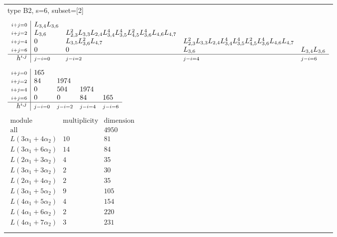 \documentclass[crop,border=2mm]{standalone}
\begin{document}
\begin{tabular}{l}
{\huge type B2, s=6, subset=[2]}\\ \\


$\displaystyle
\begin{array}{r|l l l l}
	{\scriptstyle i+j=0}&L_{3,4}L_{3,6}&&&\\
	{\scriptstyle i+j=2}&L_{3,6}&L_{2,3}^{2}L_{3,3}L_{2,4}L_{3,4}^{4}L_{3,5}^{4}L_{4,5}^{2}L_{3,6}^{4}L_{4,6}L_{4,7}&&\\
	{\scriptstyle i+j=4}&0&L_{3,5}L_{3,6}^{2}L_{4,7}&L_{2,3}^{2}L_{3,3}L_{2,4}L_{3,4}^{4}L_{3,5}^{4}L_{4,5}^{2}L_{3,6}^{4}L_{4,6}L_{4,7}&\\
	{\scriptstyle i+j=6}&0&0&L_{3,6}&L_{3,4}L_{3,6}\\
	\hline h^{i,j}&{\scriptstyle j-i=0}&{\scriptstyle j-i=2}&{\scriptstyle j-i=4}&{\scriptstyle j-i=6}
\end{array}
$ \\ \\


$\displaystyle
\begin{array}{r|l l l l}
	{\scriptstyle i+j=0}&165&&&\\
	{\scriptstyle i+j=2}&84&1974&&\\
	{\scriptstyle i+j=4}&0&504&1974&\\
	{\scriptstyle i+j=6}&0&0&84&165\\
	\hline h^{i,j}&{\scriptstyle j-i=0}&{\scriptstyle j-i=2}&{\scriptstyle j-i=4}&{\scriptstyle j-i=6}
\end{array}
$ \\ \\


$\displaystyle
\begin{array}{rll}
	\text{module}&\text{multiplicity}&\text{dimension} \\ \hline \text{all}&&4950 \\
	L\left( 3\alpha_{1}+ 4\alpha_{2}\right)&10&81\\
	L\left( 3\alpha_{1}+ 6\alpha_{2}\right)&14&84\\
	L\left( 2\alpha_{1}+ 3\alpha_{2}\right)&4&35\\
	L\left( 3\alpha_{1}+ 3\alpha_{2}\right)&2&30\\
	L\left( 2\alpha_{1}+ 4\alpha_{2}\right)&2&35\\
	L\left( 3\alpha_{1}+ 5\alpha_{2}\right)&9&105\\
	L\left( 4\alpha_{1}+ 5\alpha_{2}\right)&4&154\\
	L\left( 4\alpha_{1}+ 6\alpha_{2}\right)&2&220\\
	L\left( 4\alpha_{1}+ 7\alpha_{2}\right)&3&231
\end{array}
$ \\ \\

\end{tabular}
\end{document}
